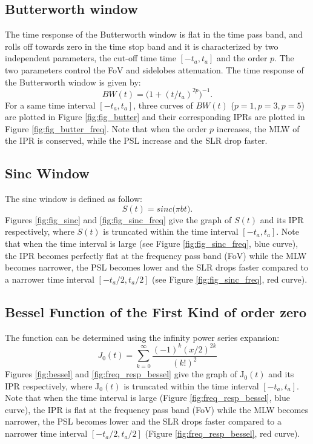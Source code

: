 \documentclass[useAMS,usenatbib]{mn2e}
\begin{document}
\subsection{Butterworth window}
The time response of the Butterworth window is flat  in the time pass band, and rolls off towards zero in the time stop band and it is 
characterized by two independent parameters, the cut-off time time $[-t_a,t_a]$ and the order $p$. The two parameters control the 
FoV and sidelobes  attenuation. The time response of the Butterworth window is given by:
\begin{equation}
BW(t)= \Big(1 + (t/t_a)^{2p}\Big)^{-1}.
\end{equation}
For a same time interval $[-t_a,t_a]$, three curves of $BW(t)$ ($p=1, p=3, p=5$) are plotted  in Figure \ref{fig:fig_butter} and 
their corresponding IPRs are plotted in Figure \ref{fig:fig_butter_freq}. Note that when the order $p$ increases, the MLW of the 
IPR is conserved, while the PSL increase and the SLR drop faster.
\subsection{Sinc Window}
The sinc window is defined as follow:
\begin{equation}
S(t)= sinc\big(\pi b t\big).
\end{equation}
 Figures \ref{fig:fig_sinc} and \ref{fig:fig_sinc_freq} give the graph of $S(t)$ and its IPR respectively, where 
$S(t)$ is truncated within the time interval $[-t_a,t_a]$. Note that when the time interval is large 
(see Figure \ref{fig:fig_sinc_freq}, blue curve), the IPR becomes perfectly flat at the frequency pass band (FoV) while the MLW becomes 
narrower,  the PSL 
becomes lower and the SLR drops faster compared to a narrower time interval $[-t_a/2,t_a/2]$ (see Figure \ref{fig:fig_sinc_freq}, red 
curve). 
\subsection{Bessel Function of the First Kind of order zero}
 The function can  be determined using the infinity power series expansion:
\begin{equation}
J_0(t) = \sum_{k=0}^{\infty}\frac{(-1)^k (x/2)^{2k}}{(k!)^2}
\end{equation}
 Figures \ref{fig:bessel} and  \ref{fig:freq_resp_bessel} give the graph of J$_0(t)$ and its IPR respectively, where 
J$_0(t)$ is truncated within the time interval $[-t_a,t_a]$. Note that when the time interval is large 
(Figure \ref{fig:freq_resp_bessel}, blue curve), the IPR is flat at the frequency pass band (FoV) while the MLW becomes narrower,  the PSL 
becomes lower and the SLR drops faster compared to a narrower time interval $[-t_a/2,t_a/2]$ (Figure \ref{fig:freq_resp_bessel}, red curve).
\end{document}

